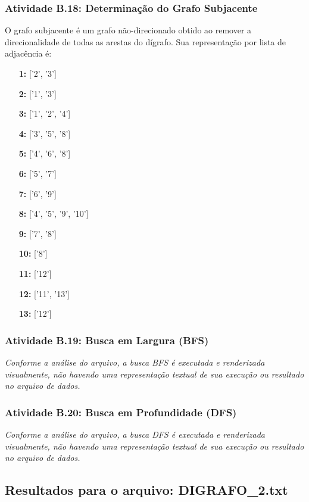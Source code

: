 \documentclass[a4paper,12pt]{article}
\begin{document}
\subsubsection*{Atividade B.18: Determinação do Grafo Subjacente}
O grafo subjacente é um grafo não-direcionado obtido ao remover a direcionalidade de todas as arestas do dígrafo. Sua representação por lista de adjacência é:
\begin{itemize}[leftmargin=*]
    \item[\textbf{1:}] ['2', '3']
    \item[\textbf{2:}] ['1', '3']
    \item[\textbf{3:}] ['1', '2', '4']
    \item[\textbf{4:}] ['3', '5', '8']
    \item[\textbf{5:}] ['4', '6', '8']
    \item[\textbf{6:}] ['5', '7']
    \item[\textbf{7:}] ['6', '9']
    \item[\textbf{8:}] ['4', '5', '9', '10']
    \item[\textbf{9:}] ['7', '8']
    \item[\textbf{10:}] ['8']
    \item[\textbf{11:}] ['12']
    \item[\textbf{12:}] ['11', '13']
    \item[\textbf{13:}] ['12']
\end{itemize}

\subsubsection*{Atividade B.19: Busca em Largura (BFS)}
\textit{Conforme a análise do arquivo, a busca BFS é executada e renderizada visualmente, não havendo uma representação textual de sua execução ou resultado no arquivo de dados.}

\subsubsection*{Atividade B.20: Busca em Profundidade (DFS)}
\textit{Conforme a análise do arquivo, a busca DFS é executada e renderizada visualmente, não havendo uma representação textual de sua execução ou resultado no arquivo de dados.}
\\

\subsection{Resultados para o arquivo: DIGRAFO\_2.txt}
\end{document}
